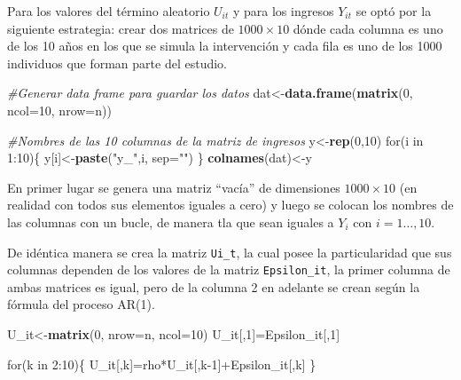 \documentclass[]{article}
\newenvironment{Shaded}{\begin{snugshade}}{\end{snugshade}}
\newcommand{\KeywordTok}[1]{\textcolor[rgb]{0.13,0.29,0.53}{\textbf{{#1}}}}
\newcommand{\DataTypeTok}[1]{\textcolor[rgb]{0.13,0.29,0.53}{{#1}}}
\newcommand{\DecValTok}[1]{\textcolor[rgb]{0.00,0.00,0.81}{{#1}}}
\newcommand{\StringTok}[1]{\textcolor[rgb]{0.31,0.60,0.02}{{#1}}}
\newcommand{\CommentTok}[1]{\textcolor[rgb]{0.56,0.35,0.01}{\textit{{#1}}}}
\newcommand{\NormalTok}[1]{{#1}}
\begin{document}
Para los valores del término aleatorio $U_{it}$ y para los ingresos
$Y_{it}$ se optó por la siguiente estrategia: crear dos matrices de
$1000\times 10$ dónde cada columna es uno de los 10 años en los que se
simula la intervención y cada fila es uno de los 1000 individuos que
forman parte del estudio.

\begin{Shaded}
\begin{Highlighting}[]
\CommentTok{#Generar data frame para guardar los datos}
\NormalTok{dat<-}\KeywordTok{data.frame}\NormalTok{(}\KeywordTok{matrix}\NormalTok{(}\DecValTok{0}\NormalTok{, }\DataTypeTok{ncol=}\DecValTok{10}\NormalTok{, }\DataTypeTok{nrow=}\NormalTok{n))}

\CommentTok{#Nombres de las 10 columnas de la matriz de ingresos}
\NormalTok{y<-}\KeywordTok{rep}\NormalTok{(}\DecValTok{0}\NormalTok{,}\DecValTok{10}\NormalTok{)}
\NormalTok{for(i in }\DecValTok{1}\NormalTok{:}\DecValTok{10}\NormalTok{)\{}
  \NormalTok{y[i]<-}\KeywordTok{paste}\NormalTok{(}\StringTok{"y_"}\NormalTok{,i, }\DataTypeTok{sep=}\StringTok{""}\NormalTok{)}
\NormalTok{\}}
\KeywordTok{colnames}\NormalTok{(dat)<-y}
\end{Highlighting}
\end{Shaded}

En primer lugar se genera una matriz ``vacía'' de dimensiones
$1000\times 10$ (en realidad con todos sus elementos iguales a cero) y
luego se colocan los nombres de las columnas con un bucle, de manera tla
que sean iguales a $Y_i$ con $i=1\dots,10$.

De idéntica manera se crea la matriz \texttt{Ui\_t}, la cual posee la
particularidad que sus columnas dependen de los valores de la matriz
\texttt{Epsilon\_it}, la primer columna de ambas matrices es igual, pero
de la columna 2 en adelante se crean según la fórmula del proceso AR(1).

\begin{Shaded}
\begin{Highlighting}[]
\NormalTok{U_it<-}\KeywordTok{matrix}\NormalTok{(}\DecValTok{0}\NormalTok{, }\DataTypeTok{nrow=}\NormalTok{n, }\DataTypeTok{ncol=}\DecValTok{10}\NormalTok{)}
\NormalTok{U_it[,}\DecValTok{1}\NormalTok{]=Epsilon_it[,}\DecValTok{1}\NormalTok{]}

\NormalTok{for(k in }\DecValTok{2}\NormalTok{:}\DecValTok{10}\NormalTok{)\{}
  \NormalTok{U_it[,k]=rho*U_it[,k}\DecValTok{-1}\NormalTok{]+Epsilon_it[,k]}
\NormalTok{\}}
\end{Highlighting}
\end{Shaded}
\end{document}
